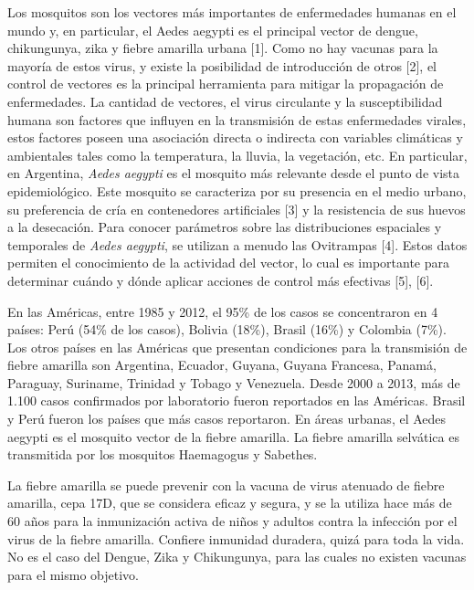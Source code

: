 Los mosquitos son los vectores más importantes de enfermedades humanas en el
mundo y, en particular, el Aedes aegypti es el principal vector de dengue,
chikungunya, zika y fiebre amarilla urbana [1]. Como no hay vacunas para la
mayoría de estos virus, y existe la posibilidad de introducción de otros [2],
el control de vectores es la principal herramienta para mitigar la
propagación de enfermedades. La cantidad de vectores, el virus circulante y la
susceptibilidad humana son factores que influyen en la transmisión de estas
enfermedades virales, estos factores poseen una asociación directa o indirecta
con variables climáticas y ambientales tales como la temperatura, la lluvia,
la vegetación, etc. En particular, en Argentina, \textit{Aedes aegypti} es el
mosquito más relevante desde el punto de vista epidemiológico.
Este mosquito se caracteriza por su presencia en el medio urbano, su preferencia
de cría en contenedores artificiales [3] y la resistencia de sus huevos a la
desecación. Para conocer parámetros sobre las distribuciones espaciales y temporales
de \textit{Aedes aegypti}, se utilizan a menudo las Ovitrampas [4].
Estos datos permiten el conocimiento de la actividad del vector, lo cual es importante para determinar cuándo y
dónde aplicar acciones de control más efectivas [5], [6].




En las Américas, entre 1985 y 2012, el 95\% de los casos se concentraron en
4 países: Perú (54\% de los casos), Bolivia (18\%), Brasil (16\%) y Colombia (7\%).
Los otros países en las Américas que presentan condiciones para la transmisión
de fiebre amarilla son Argentina, Ecuador, Guyana, Guyana Francesa, Panamá,
Paraguay, Suriname, Trinidad y Tobago y Venezuela.
Desde 2000 a 2013, más de 1.100 casos confirmados por laboratorio fueron
reportados en las Américas. Brasil y Perú fueron los países que más casos
reportaron. En áreas urbanas, el Aedes aegypti es el mosquito vector de la
fiebre amarilla. La fiebre amarilla selvática es transmitida por los mosquitos
Haemagogus y Sabethes.

La fiebre amarilla se puede prevenir con la vacuna de virus atenuado de fiebre
amarilla, cepa 17D, que se considera eficaz y segura, y se la utiliza hace más
de 60 años para la inmunización activa de niños y adultos contra la infección
por el virus de la fiebre amarilla. Confiere inmunidad duradera, quizá para toda
la vida. No es el caso del Dengue, Zika y Chikungunya, para las cuales no existen
vacunas para el mismo objetivo.



